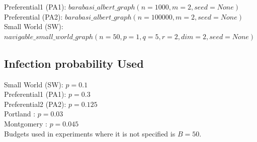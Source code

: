 Preferential1 (PA1): $barabasi\_albert\_graph(n=1000, m=2, seed=None)$\\

Preferential (PA2):  $barabasi\_albert\_graph(n=100000, m=2, seed=None)$\\

Small World (SW): $navigable\_small\_world\_graph(n=50, p=1, q=5, r=2, dim=2, seed=None)$\\

\subsection{Infection probability Used}
Small World (SW): $p = 0.1$ \\
Preferential1 (PA1): $p = 0.3$ \\
Preferential2 (PA2): $p = 0.125$ \\
Portland : $p = 0.03$ \\
Montgomery : $p = 0.045$ \\

\noindent
Budgets used in experiments where it is not specified is $B = 50$.

